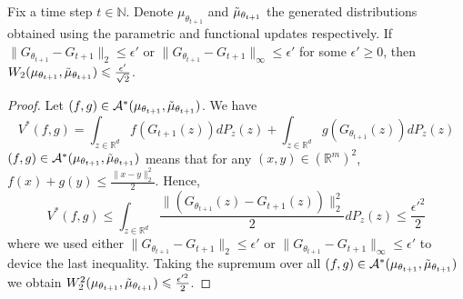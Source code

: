 \documentclass[runningheads]{llncs}
\begin{document}
\begin{proposition}
\normalfont
\label{deviation_ideal_update}
Fix a time step $t\in \mathds{N}$. Denote $\mu_{\theta_{t+1}}$ and $\Tilde{\mu}_{\theta_{t+1}}$ the generated distributions obtained using the parametric and functional updates respectively. If $\|G_{\theta_{t+1}}-G_{t+1}\|_2\leqslant \epsilon'$ or $\|G_{\theta_{t+1}}-G_{t+1}\|_\infty\leqslant \epsilon'$ for some $ \epsilon' \geqslant 0$, then $W_2(\mu_{\theta_{t+1}},\Tilde{\mu}_{\theta_{t+1}})\leqslant \frac{\epsilon'}{\sqrt{2}}$. 

\end{proposition}
\begin{proof}
Let $(f,g) \in  \mathcal{A}^*(\mu_{\theta_{t+1}},\Tilde{\mu}_{\theta_{t+1}})$. We have
\[V^*(f,g)=\int_{z\in \mathds{R}^d} f(G_{t+1}(z))dP_z(z)+ \int_{z\in \mathds{R}^d} g(G_{\theta_{t+1}}(z))dP_z(z)\]
$(f,g)\in \mathcal{A}^*(\mu_{\theta_{t+1}},\Tilde{\mu}_{\theta_{t+1}})$ means that for any $(x,y)\in (\mathds{R}^m)^2$, $f(x)+g(y)\leqslant \frac{\|x-y\|_2^2}{2}$. Hence,
\[V^*(f,g)\leqslant \int_{z\in \mathds{R}^d} \frac{\|(G_{\theta_{t+1}}(z)-G_{t+1}(z))\|_2^2}{2} dP_z(z)\leqslant \frac{\epsilon'^2}{2}\]
where we used either $\|G_{\theta_{t+1}}-G_{t+1}\|_2\leqslant \epsilon'$ or $\|G_{\theta_{t+1}}-G_{t+1}\|_\infty\leqslant \epsilon'$ to device the last inequality. Taking the supremum over all $(f,g)\in \mathcal{A}^*(\mu_{\theta_{t+1}},\Tilde{\mu}_{\theta_{t+1}})$ we obtain $W_2^2(\mu_{\theta_{t+1}},\Tilde{\mu}_{\theta_{t+1}})\leqslant \frac{\epsilon'^2}{2}$.
\end{proof}
\end{document}
